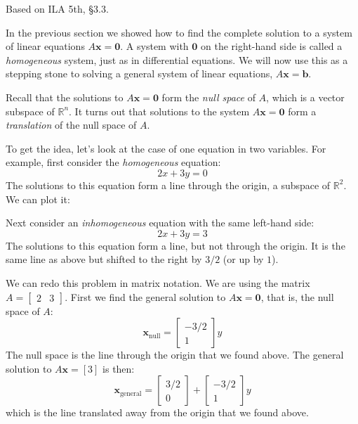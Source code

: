 \documentclass[11pt,oneside]{amsbook}
\newcommand{\R}{\mathbb R}
\theoremstyle{definition}
\theoremstyle{plain}
\theoremstyle{definition}
\theoremstyle{remark}
\numberwithin{equation}{section}
\numberwithin{figure}{section}
\begin{document}
Based on ILA 5th, \S 3.3.

In the previous section we showed how to find the complete solution to a system of linear equations $A\mathbf{x}=\mathbf{0}$. A system with $\mathbf{0}$ on the right-hand side is called a \emph{homogeneous} system, just as in differential equations. We will now use this as a stepping stone to solving a general system of linear equations, $A\mathbf{x}=\mathbf{b}$.

Recall that the solutions to $A\mathbf{x}=\mathbf{0}$ form the \emph{null space} of $A$, which is a vector subspace of $\R^n$. It turns out that solutions to the system $A\mathbf{x}=\mathbf{0}$ form a \emph{translation} of the null space of $A$.

To get the idea, let's look at the case of one equation in two variables. For example, first consider the \emph{homogeneous} equation:
\[2x+3y=0
\]
The solutions to this equation form a line through the origin, a subspace of $\R^2$. We can plot it:

\begin{center}
\end{center}

Next consider an \emph{inhomogeneous} equation with the same left-hand side:
\[2x+3y=3
\]
The solutions to this equation form a line, but not through the origin. It is the same line as above but shifted to the right by $3/2$ (or up by $1$).

\begin{center}
\end{center}

We can redo this problem in matrix notation. We are using the matrix $A=\begin{bmatrix}2&3\end{bmatrix}$. First we find the general solution to $A\mathbf{x}=\mathbf{0}$, that is, the null space of $A$:
\[\mathbf{x}_{\mathrm{null}}
  =\begin{bmatrix}-3/2\\1\end{bmatrix}y
\]
The null space is the line through the origin that we found above. The general solution to $A\mathbf{x}=[3]$ is then:
\[\mathbf{x}_{\mathrm{general}}
  =\begin{bmatrix}3/2\\0\end{bmatrix}
  +\begin{bmatrix}-3/2\\1\end{bmatrix}y
\]
which is the line translated away from the origin that we found above.
\end{document}
